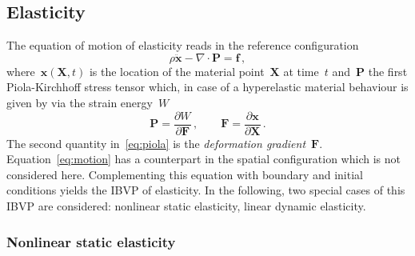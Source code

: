 \documentclass[a4paper,DIV=12,10pt]{scrartcl}
\newcommand{\vek}[1]{\boldsymbol{#1}}  %
\newcommand{\x}[0]{\vek{x}}
\newcommand{\X}[0]{\vek{X}}
\begin{document}
\newpage
\subsection{Elasticity}
\label{sec:elasticity}

The equation of motion of elasticity reads in the reference configuration
\begin{equation}
  \label{eq:motion}
  \rho \ddot{\vek{x}} - \nabla \cdot \vek{P} = \vek{f}\,,
\end{equation}
where~$\vek{x}(\X,t)$ is the location of the material point~$\X$ at
time~$t$ and~$\vek{P}$ the first Piola-Kirchhoff stress tensor which,
in case of a hyperelastic material behaviour is given by via the
strain energy~$W$
\begin{equation}
  \label{eq:piola}
  \vek{P} = \frac{\partial W}{\partial \vek{F}}\,, \qquad
  \vek{F} = \frac{\partial \x}{\partial \X}\,.
\end{equation}
The second quantity in~\eqref{eq:piola} is the \emph{deformation
  gradient}~$\vek{F}$.  Equation~\eqref{eq:motion} has a counterpart
in the spatial configuration which is not considered
here. Complementing this equation with boundary and initial conditions
yields the IBVP of elasticity. In the following, two special cases of
this IBVP are considered: nonlinear static elasticity, linear dynamic
elasticity.

\subsubsection{Nonlinear static elasticity}
\label{sec:nonlinear}
\end{document}
